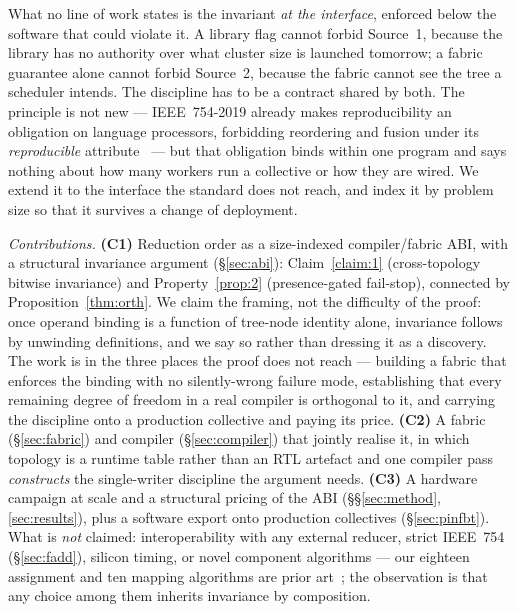 \documentclass[journal,10pt]{IEEEtran}
\theoremstyle{plain}
\theoremstyle{definition}
\theoremstyle{remark}
\begin{document}
What no line of work states is the invariant \emph{at the interface}, enforced
below the software that could violate it. A library flag cannot forbid
Source~1, because the library has no authority over what cluster size is
launched tomorrow; a fabric guarantee alone cannot forbid Source~2, because
the fabric cannot see the tree a scheduler intends. The discipline has to be a
contract shared by both. The principle is not new --- IEEE~754-2019 already
makes reproducibility an obligation on language processors, forbidding
reordering and fusion under its \emph{reproducible}
attribute~\cite{ieee754-2019} --- but that obligation binds within one
program and says nothing about how many workers run a collective or how they
are wired. We extend it to the interface the standard does not reach, and
index it by problem size so that it survives a change of deployment.

\emph{Contributions.} \textbf{(C1)} Reduction order as a size-indexed
compiler/fabric ABI, with a structural invariance argument
(\S\ref{sec:abi}): Claim~\ref{claim:1} (cross-topology bitwise invariance)
and Property~\ref{prop:2} (presence-gated fail-stop), connected by
Proposition~\ref{thm:orth}. We claim the framing, not the difficulty of the proof: once
operand binding is a function of tree-node identity alone, invariance follows
by unwinding definitions, and we say so rather than dressing it as a
discovery. The work is in the three places the proof does not reach ---
building a fabric that enforces the binding with no silently-wrong failure
mode, establishing that every remaining degree of freedom in a real compiler
is orthogonal to it, and carrying the discipline onto a production collective
and paying its price. \textbf{(C2)} A fabric (\S\ref{sec:fabric}) and compiler
(\S\ref{sec:compiler}) that jointly realise it, in which topology is a runtime
table rather than an RTL artefact and one compiler pass \emph{constructs} the
single-writer discipline the argument needs. \textbf{(C3)} A hardware campaign
at scale and a structural pricing of the ABI (\S\S\ref{sec:method},
\ref{sec:results}), plus a software export onto production collectives
(\S\ref{sec:pinfbt}). What is \emph{not} claimed: interoperability with any
external reducer, strict IEEE~754 (\S\ref{sec:fadd}), silicon timing, or novel
component algorithms --- our eighteen assignment and ten mapping algorithms
are prior art~\cite{topcuoglu2002heft,lukes1974efficient,dally2004principles};
the observation is that any choice among them inherits invariance by
composition.
\end{document}
